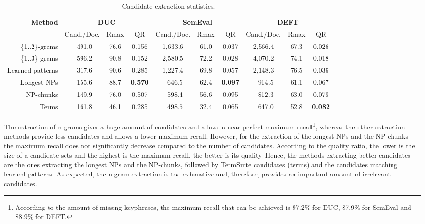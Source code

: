     \begin{table*}
      \centering
      \begin{tabular}{@{~}r@{~~}c@{~~}c@{~~}c@{~~}c@{~~}c@{~~}c@{~~}c@{~~}c@{~~}c@{~}}
        \toprule
        \multirow{2}{*}[-2pt]{\textbf{Method}} & \multicolumn{3}{c}{\textbf{DUC}} & \multicolumn{3}{c}{\textbf{SemEval}} & \multicolumn{3}{c}{\textbf{DEFT}}\\
        \cmidrule(r){2-4}\cmidrule(r){5-7}\cmidrule{8-10}
        & Cand./Doc. & Rmax & QR & Cand./Doc. & Rmax & QR & Cand./Doc. & Rmax &
        QR\\
        \midrule
        \{1..2\}-grams & $~~~$491.0 & 76.6 & 0.156 & 1,633.6 & 61.0 & 0.037 & 2,566.4 & 67.3 & 0.026\\
        \{1..3\}-grams & $~~~$596.2 & 90.8 & 0.152 & 2,580.5 & 72.2 & 0.028 & 4,070.2 & 74.1 & 0.018\\
        Learned patterns & $~~~$317.6 & 90.6 & 0.285 & 1,227.4 & 69.8 & 0.057 & 2,148.3 & 76.5 & 0.036\\
        Longest NPs & $~~~$155.6 & 88.7 & \textbf{0.570} & $~~~$646.5 & 62.4 & \textbf{0.097} & $~~~$914.5 & 61.1 & 0.067\\
        NP-chunks & $~~~$149.9 & 76.0 & 0.507 & $~~~$598.4 & 56.6 & 0.095 & $~~~$812.3 & 63.0 & 0.078\\
        Terms & $~~~$161.8 & 46.1 & 0.285 & $~~~$498.6 & 32.4 & 0.065 & $~~~$647.0 & 52.8 & \textbf{0.082}\\
        \bottomrule
      \end{tabular}
      \caption{Candidate extraction statistics.
               \label{tab:candidate_extraction_statistics}}
    \end{table*}

      The extraction  of n-grams gives a huge amount of candidates and allows a
      near perfect maximum recall\footnote{According to the amount of missing
      keyphrases, the maximum recall that can be achieved is 97.2\% for DUC,
      87.9\% for SemEval and 88.9\% for DEFT.}, whereas the other extraction
      methods provide less candidates and allows a lower maximum recall.
      However, for the extraction of the longest NPs and the NP-chunks, the
      maximum recall does not significantly decrease compared to the number of
      candidates. According to the quality ratio, the lower is the size of a
      candidate sets and the highest is the maximum recall, the better is its
      quality. Hence, the methods extracting better
      candidates are the ones extracting the longest NPs and the NP-chunks,
      followed by TermSuite candidates (terms) and the candidates matching
      learned patterns. As expected, the n-gram extraction is too exhaustive
      and, therefore, provides an important amount of irrelevant candidates.
      
